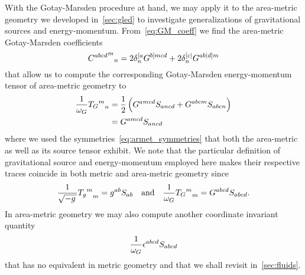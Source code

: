 With the Gotay-Marsden procedure at hand, we may apply it to the area-metric geometry we developed in~\autoref{sec:gled} to investigate generalizations of gravitational sources and energy-momentum. From~\eqref{eq:GM_coeff} we find the area-metric Gotay-Marsden coefficients
\begin{equation}
	{{C^{abcd}}^{m}}_{n}=2\delta^{[ a}_nG^{b] mcd}+2\delta^{[ c|}_nG^{ab| d] m}
\end{equation}
that allow us to compute the corresponding Gotay-Marsden energy-momentum tensor of area-metric geometry to
\begin{align}
	\frac{1}{\omega_G}{{T_G}^m}_n&=\frac{1}{2}\left(G^{amcd}S_{ancd}+G^{abcm}S_{abcn}\right)\\
	&=G^{amcd}S_{ancd}\label{eq:emt_armet}
\end{align}
where we used the symmetries~\eqref{eq:armet_symmetries} that both the area-metric as well as its source tensor exhibit. We note that the particular definition of gravitational source and energy-momentum employed here makes their respective traces coincide in both metric and area-metric geometry since
\begin{equation}\label{eq:emtrace}
	\frac{1}{\sqrt{-g\,}}{{T_g}^m}_m=g^{ab}S_{ab} \quad \text{and} \quad \frac{1}{\omega_G}{{T_G}^m}_m=G^{abcd}S_{abcd}
	\mathpunct{.}
\end{equation}
In area-metric geometry we may also compute another coordinate invariant quantity
\begin{equation}\label{eq:sourcet_gled_levciv}
	\frac{1}{\omega_G}\epsilon^{abcd}S_{abcd}
\end{equation}
that has no equivalent in metric geometry and that we shall revisit in~\autoref{sec:fluids}.

